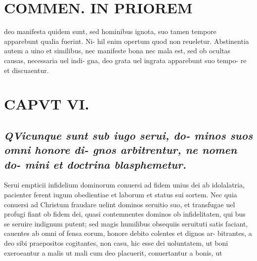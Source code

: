 \documentclass{article}
\begin{document}
\begin{pages}
\section*{COMMEN. IN PRIOREM }
\marginpar{[ p.152 ]}\pstart deo manifesta quidem sunt, sed hominibus ignota, suo tamen tempore apparebunt qualia fuerint. Ni- hil enim opertum quod non reueletur. Abstinentia autem a uino et similibus, nec manifeste bona nec mala est, sed ob ocultas causas, necessaria uel indi- gna, deo grata uel ingrata apparebunt suo tempo- re et discuaentur.  \pend
\endnumbering\beginnumbering\section{CAPVT VI.}
{}
\subsection*{\textit{\huge\textbf{Q}\normalsize Vicunque sunt sub iugo serui, do- minos suos omni honore di- gnos arbitrentur, ne nomen do- mini et doctrina blasphemetur. }}\pstart Serui empticii infidelium dominorum conuersi ad fidem unius dei ab idolalatria, pacienter ferent iugum obedientiae et laborum et status sui sortem. Nec quia conuersi ad Christum fraudare uelint dominos seruitio suo, et transfugae uel profugi fiant ob fidem dei, quasi contemnentes dominos ob infidelitaten, qui bus se seruire indignum putent; sed magis humilibus obsequiis seruituti satis faciant, cauentes ab omni of fensa eorum, honore debito colentes et dignos ar- bitrantes, a deo sibi praepositos cogitantes, non casu, hic esse dei uoluntatem, ut boni exeroeantur a malis ut mali cum deo placuerit, conuertantur a bonis, ut  \pend

\end{pages}
\end{document}
